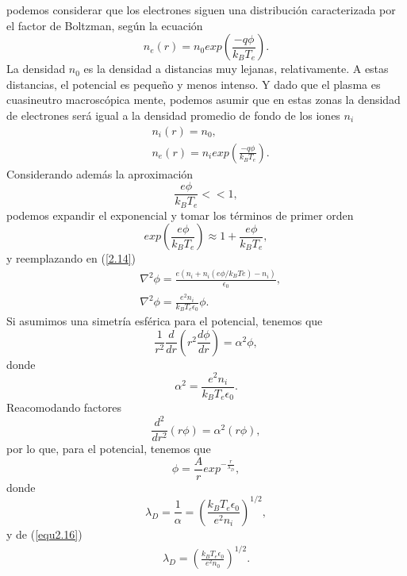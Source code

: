 \documentclass[../main.tex]{subfiles}
\begin{document}
    podemos considerar que los electrones siguen una distribución caracterizada por el factor de Boltzman, según la ecuación
        \begin{equation}
            n_e(r) = n_{0}exp\left(\frac{-q\phi}{k_BT_e}\right).
        \end{equation}
    La densidad $n_0$ es la densidad a distancias muy lejanas, relativamente. A estas distancias, el potencial es pequeño y menos intenso. Y dado
    que el plasma es cuasineutro macroscópica mente, podemos asumir que en estas zonas la densidad de electrones será igual a la densidad
    promedio de fondo de los iones $n_i$ 
    \begin{align}
        &n_i(r) = n_0, \label{equ2.16} \\ 
        &n_e(r) = n_iexp\left(\frac{-q\phi}{k_BT_e}\right).
    \end{align}
    Considerando además la aproximación 
        \begin{equation} \label{equaprox} \frac{e\phi}{k_BT_e} << 1,
        \end{equation}
    podemos expandir el exponencial y tomar los términos de primer orden
        \begin{equation} exp(\frac{e\phi}{k_BT_e}) \approx 1 + \frac{e\phi}{k_BT_e},
        \end{equation}
    y reemplazando en (\ref{2.14}) 
    \begin{align}
        &\nabla^2\phi = \frac{e(n_i+n_i(e\phi/k_BTe)-n_i)}{\epsilon_0}, \\
        &\nabla^2\phi = \frac{e^2n_i}{k_BT_e\epsilon_0}\phi.
    \end{align}
    Si asumimos una simetría esférica para el potencial, tenemos que 
        \begin{equation}
            \frac{1}{r^2}\frac{d}{dr}(r^2\frac{d\phi}{dr}) = \alpha^2\phi,
        \end{equation}
    donde
        \begin{equation}
            \alpha^2 = \frac{e^2n_i}{k_BT_e\epsilon_0}.
        \end{equation}
    Reacomodando factores
        \begin{equation}
            \frac{d^2}{dr^2}(r\phi) = \alpha^2(r\phi),
        \end{equation}
    por lo que, para el potencial, tenemos que
        \begin{equation} \label{2.25}
            \phi = \frac{A}{r}exp^{-\frac{r}{\lambda_D}},
        \end{equation}
    donde
        \begin{equation}
            \lambda_D = \frac{1}{\alpha} = (\frac{k_BT_e\epsilon_0}{e^2n_i})^{1/2},
        \end{equation}
    y de (\ref{equ2.16})
        \begin{align}
            \lambda_D = (\frac{k_BT_e\epsilon_0}{e^2n_0})^{1/2}. \label{long_deby}
        \end{align}
        
\end{document}
